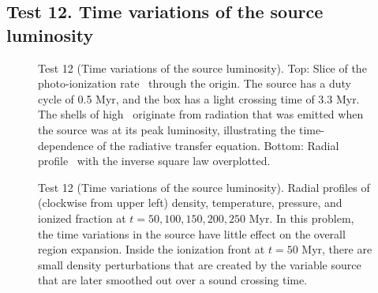 \documentclass[useAMS,usenatbib,a4paper]{mn2e}
\begin{document}


\subsection{Test 12. Time variations of the source luminosity}

\begin{figure}
  \caption{\label{fig:test12_kph} Test 12 (Time variations of the
    source luminosity).  Top: Slice of the photo-ionization rate
    \kph~through the origin.  The source has a duty cycle of 0.5 Myr,
    and the box has a light crossing time of 3.3 Myr.  The shells of
    high \kph~originate from radiation that was emitted when the
    source was at its peak luminosity, illustrating the
    time-dependence of the radiative transfer equation.  Bottom:
    Radial profile \kph~with the inverse square law overplotted.}
\end{figure}

\begin{figure}
  \caption{\label{fig:test12_profiles} Test 12 (Time variations of the
    source luminosity).  Radial profiles of (clockwise from upper
    left) density, temperature, pressure, and ionized fraction at $t =
    50, 100, 150, 200, 250$ Myr.  In this problem, the time variations
    in the source have little effect on the overall \hii region
    expansion.  Inside the ionization front at $t = 50$ Myr, there are
    small density perturbations that are created by the variable
    source that are later smoothed out over a sound crossing time.}
\end{figure}
\end{document}
